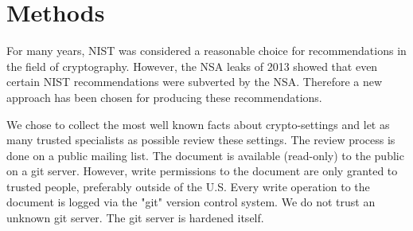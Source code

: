 \section{Methods}

For many years, NIST was considered a reasonable choice for recommendations in
the field of cryptography. However, the NSA leaks of 2013 showed that even
certain NIST recommendations were
\cite{NSAEffortstoEvadeEncryptionTechnologyDamagedU.S.CryptographyStandard}{subverted
by the NSA}.  Therefore a new approach has been chosen for producing these
recommendations. 

We chose to collect the most well known facts about crypto-settings and let as
many trusted specialists as possible review these settings.  The review process
is done on a public mailing list. The document is available (read-only) to the
public on a git server. However, write permissions to the document are only
granted to trusted people, preferably outside of the U.S.  Every write
operation to the document is logged via the "git" version control system.  We
do not trust an unknown git server. The git server is hardened itself.




